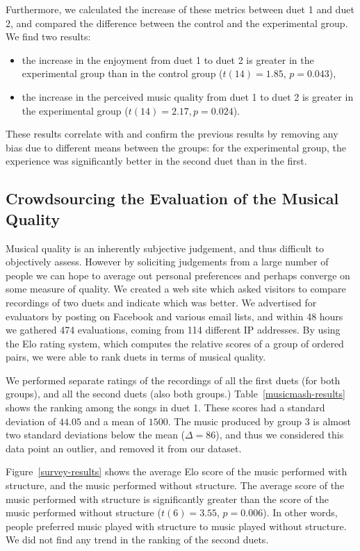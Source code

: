 \documentclass{article}
\begin{document}
Furthermore, we calculated the increase of these metrics between duet 1 and duet 2, and compared the difference between the control and the experimental group. We find two results:
\begin{itemize}
\item the increase in the enjoyment from duet 1 to duet 2 is greater in the experimental group than in the control group ($t(14) = 1.85$, $p = 0.043$),
\item the increase in the perceived music quality from duet 1 to duet 2 is greater in the experimental group ($t(14) = 2.17, p = 0.024$).
\end{itemize}
These results correlate with and confirm the previous results by removing any bias due to different means between the groups: for the experimental group, the experience was significantly better in the second duet than in the first.


\subsection{Crowdsourcing the Evaluation of the Musical Quality}

Musical quality is an inherently subjective judgement, and thus difficult to objectively assess.  However by soliciting judgements from a large number of people we can hope to average out personal preferences and perhaps converge on some measure of quality.  We created a web site which asked visitors to compare recordings of two duets and indicate which was better.  We advertised for evaluators by posting on Facebook and various email lists, and within 48 hours we gathered 474 evaluations, coming from 114 different IP addresses. By using the Elo rating system, which computes the relative scores of a group of ordered pairs, we were able to rank duets in terms of musical quality.

We performed separate ratings of the recordings of all the first duets (for both groups), and all the second duets (also both groups.)  Table~\ref{musicmash-results} shows the ranking among the songs in duet 1. These scores had a standard deviation of $44.05$ and a mean of $1500$.  The music produced by group 3 is almost two standard deviations below the mean ($\Delta = 86$), and thus we considered this data point an outlier, and removed it from our dataset.

Figure~\ref{survey-results} shows the average Elo score of the music performed with structure, and the music performed without structure. The average score of the music performed with structure is significantly greater than the score of the music performed without structure ($t(6) = 3.55$, $p = 0.006$). In other words, people preferred music played with structure to music played without structure.  We did not find any trend in the ranking of the second duets.
\end{document}
